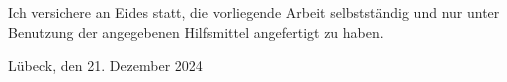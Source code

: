\thispagestyle{empty}

\vspace*{7cm}
\noindent Ich versichere an Eides statt, die vorliegende Arbeit selbstständig und nur unter Benutzung der angegebenen Hilfsmittel angefertigt zu haben.

\vspace*{3cm}
\noindent Lübeck, den 21. Dezember 2024
\newpage
